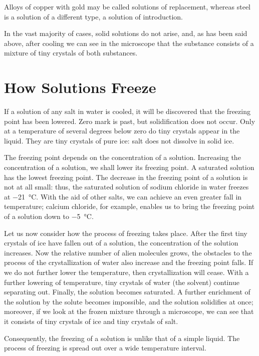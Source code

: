 Alloys of copper with gold may be called solutions of replacement, whereas steel is a solution of a different type, a solution of introduction.

In the vast majority of cases, solid solutions do not arise, and, as has been said above, after cooling we can see in the microscope that the substance consists of a mixture of tiny crystals of both substances.

\section{How Solutions Freeze}

If a solution of any salt in water is cooled, it will be discovered that the freezing point has been lowered. Zero mark is past, but solidification does not occur. Only at a temperature of several degrees below zero do tiny crystals appear in the liquid. They are tiny crystals of pure ice: salt does not dissolve in solid ice.

The freezing point depends on the concentration of a solution. Increasing the concentration of a solution, we shall lower its freezing point. A saturated solution has the lowest freezing point. The decrease in the freezing point of a solution is not at all small: thus, the saturated solu­tion of sodium chloride in water freezes at \SI{-21}{\celsius}. With the aid of other salts, we can achieve an even greater fall in temperature; calcium chloride, for example, enables us to bring the freezing point of a solution down to \SI{-5}{\celsius}.

Let us now consider how the process of freezing takes place. After the first tiny crystals of ice have fallen out of a solution, the concentration of the solution increases. Now the relative number of alien molecules grows, the obstacles to the process of the crystallization of water also increase and the freezing point falls. If we do not further lower the temperature, then crystallization will cease. With a further lowering of temperature, tiny crys­tals of water (the solvent) continue separating out. Finally, the solution becomes saturated. A further enrich­ment of the solution by the solute becomes impossible, and the solution solidifies at once; moreover, if we look at the frozen mixture through a microscope, we can see that it consists of tiny crystals of ice and tiny crystals of salt.

Consequently, the freezing of a solution is unlike that of a simple liquid. The process of freezing is spread out over a wide temperature interval.

